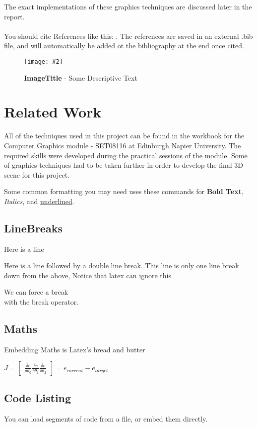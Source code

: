 \documentclass[10pt, a4paper]{article}
\newcommand{\figuremacro}[5]{
    \begin{figure}[#1]
        \centering
        \texttt{[image: \#2]}
        \caption[#3]{\textbf{#3}#4}
        \label{fig:#2}
    \end{figure}
}
\begin{document}
    The exact implementations of these graphics techniques are discussed later in the report.
    \\\\You should cite References like this: \cite{Keshav}. The references are saved in an external .bib file, and will automatically be added ot the bibliography at the end once cited.
    
    \figuremacro{h}{placeholder}{ImageTitle}{ - Some Descriptive Text}{1.0}
	
	\section{Related Work}
	
	All of the techniques used in this project can be found in the workbook for the Computer Graphics module - SET08116 at Edinburgh Napier University. The required skills were developed during the practical sessions of the module. Some of graphics techniques had to be taken further in order to develop the final 3D scene for this project.
	
	Some common formatting you may need uses these commands for \textbf{Bold Text}, \textit{Italics}, and \underline{underlined}.
	\subsection{LineBreaks}
	Here is a line
    
    Here is a line followed by a double line break.
	This line is only one line break down from the above, Notice that latex can ignore this
    
    We can force a break \\ with the break operator.
    
	\subsection{Maths}
    Embedding Maths is Latex's bread and butter    
    
    {\centering \Large \(
        J = \begin{bmatrix}
            \frac{\delta e}{\delta \theta _0}
            \frac{\delta e}{\delta \theta _1}
            \frac{\delta e}{\delta \theta _2}
        \end{bmatrix}
        = e_{current} - e_{target} 
    \)\par}
	
	\subsection{Code Listing}
    You can load segments of code from a file, or embed them directly.
    
\end{document}
